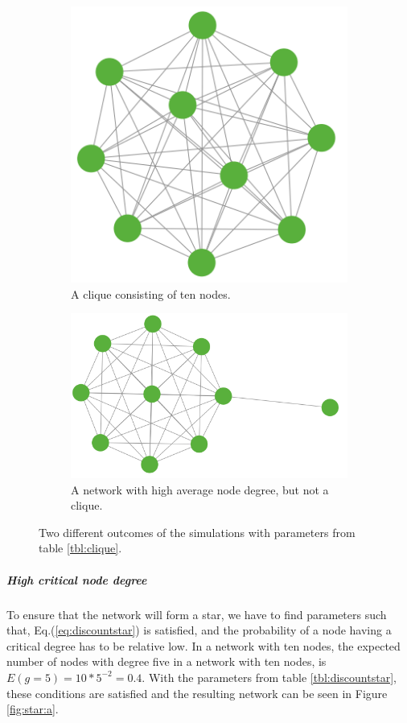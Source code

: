 \begin{figure}[h]
\centering
\begin{subfigure}{.5\textwidth}
  \centering
  \includegraphics[width=0.4\linewidth]{../Figures/discount/cliquetennodes.png}
  \caption{\label{fig:discountclique} A clique consisting of ten nodes. }
\end{subfigure}
\quad
\begin{subfigure}{.46\textwidth}
  \centering
  \includegraphics[width=0.8\linewidth]{../Figures/discount/baloontennodes.png}
  \caption{\label{fig:discountbaloon} A network with high average node degree, but not a clique.}
\end{subfigure}
\caption{\label{fig:discounthighdegree} Two different outcomes of the simulations with parameters from table \ref{tbl:clique}.}
\end{figure}




\subparagraph{High critical node degree}
To ensure that the network will form a star, we have to find parameters such that, Eq.(\ref{eq:discountstar}) is satisfied, and the probability of a node having a critical degree has to be relative low. In a network with ten nodes, the expected number of nodes with degree five in a network with ten nodes, is $E(g=5)=10*5^{-2}=0.4$. With the parameters from table \ref{tbl:discountstar}, these conditions are satisfied and the resulting network can be seen in Figure \ref{fig:star:a}.
  
